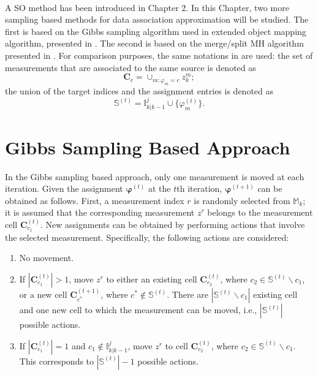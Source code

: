 ~\\
A SO method has been introduced in Chapter 2. In this Chapter, two more sampling based methods for data association approximation will be studied. The first is based on the Gibbs sampling algorithm used in extended object mapping algorithm, presented in \cite{gibbs}. The second is based on the merge/split MH algorithm presented in \cite{mergesplit}. For comparison purposes, the same notations in \cite{soextended} are used: the set of measurements that are associated to the same source is denoted as
\begin{equation}
    \mathbf{C}_c = \cup_{m:\varphi_m=c}z_k^m;
\end{equation}
the union of the target indices and the assignment entries is denoted as
\begin{equation}
    \mathbb{S}^{(t)} = \mathbb{I}^j_{k|k-1}\cup\{\varphi^{(t)}_m\}.
\end{equation}





\section{Gibbs Sampling Based Approach}
In the Gibbs sampling based approach, only one measurement is moved at each iteration. Given the assignment $\boldsymbol{\varphi}^{(t)}$ at the $t$th iteration, $\boldsymbol{\varphi}^{(t+1)}$ can be obtained as follows. First, a measurement index $r$ is randomly selected from $\mathbb{M}_k$; it is assumed that the corresponding measurement $z^r$ belongs to the measurement cell $\mathbf{C}^{(t)}_{c_1}$. New assignments can be obtained by performing actions that involve the selected measurement. Specifically, the following actions are considered:

\begin{enumerate}
    \item No movement.
    \item If $|\mathbf{C}_{c_1}^{(t)}|>1$, move $z^r$ to either an existing cell $\mathbf{C}^{(t)}_{c_2}$, where $c_2\in\mathbb{S}^{(t)}\backslash c_1$, or a new cell $\mathbf{C}_{c^*}^{(t+1)}$, where $c^*\notin\mathbb{S}^{(t)}$. There are $|\mathbb{S}^{(t)}\backslash c_1|$ existing cell and one new cell to which the measurement can be moved, i.e., $|\mathbb{S}^{(t)}|$ possible actions. 
    \item If $|\mathbf{C}_{c_1}^{(t)}|=1$ and $c_1\notin\mathbb{I}^j_{k|k-1}$, move $z^r$ to cell $\mathbf{C}^{(t)}_{c_2}$, where $c_2\in\mathbb{S}^{(t)}\backslash c_1$. This corresponds to $|\mathbb{S}^{(t)}|-1$ possible actions. 
\end{enumerate}

